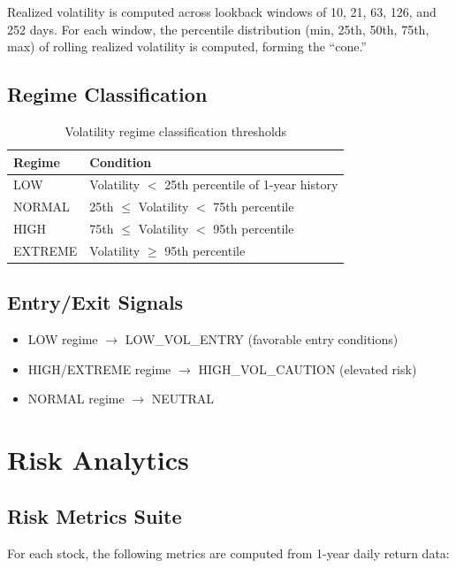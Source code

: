 \documentclass[12pt, a4paper, oneside]{report}
\begin{document}
Realized volatility is computed across lookback windows of 10, 21, 63, 126, and 252 days. For each window, the percentile distribution (min, 25th, 50th, 75th, max) of rolling realized volatility is computed, forming the ``cone.''

\subsection{Regime Classification}

\begin{table}[H]
\centering
\caption{Volatility regime classification thresholds}
\label{tab:vol_regimes}
\begin{tabular}{@{}ll@{}}
\toprule
\textbf{Regime} & \textbf{Condition} \\
\midrule
LOW & Volatility $<$ 25th percentile of 1-year history \\
NORMAL & 25th $\leq$ Volatility $<$ 75th percentile \\
HIGH & 75th $\leq$ Volatility $<$ 95th percentile \\
EXTREME & Volatility $\geq$ 95th percentile \\
\bottomrule
\end{tabular}
\end{table}

\subsection{Entry/Exit Signals}

\begin{itemize}[nosep]
    \item LOW regime $\to$ LOW\_VOL\_ENTRY (favorable entry conditions)
    \item HIGH/EXTREME regime $\to$ HIGH\_VOL\_CAUTION (elevated risk)
    \item NORMAL regime $\to$ NEUTRAL
\end{itemize}

\section{Risk Analytics}
\label{sec:meth_risk}

\subsection{Risk Metrics Suite}

For each stock, the following metrics are computed from 1-year daily return data:
\end{document}
